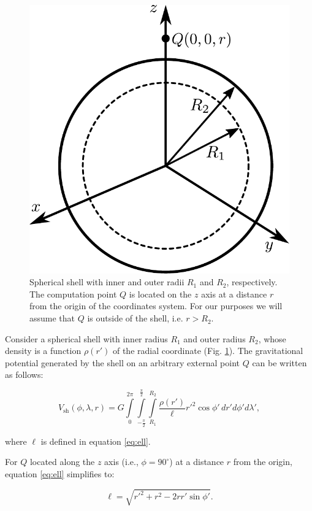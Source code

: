 \documentclass[extra]{gji}
\begin{document}
\begin{figure}
\centering
\includegraphics[width=0.7\linewidth]{figures/spherical-shell.pdf}
\caption{
    Spherical shell with inner and outer radii $R_1$ and $R_2$, respectively.
    The computation point $Q$ is located on the $z$ axis at a distance $r$ from
    the origin of the coordinates system.
    For our purposes we will assume that $Q$ is outside of the shell,
    i.e. $r > R_2$.
}
\label{fig:spherical-shell}
\end{figure}

Consider a spherical shell with inner radius $R_1$ and outer radius $R_2$,
whose density is a function $\rho(r')$ of the radial coordinate
(Fig. \ref{fig:spherical-shell}).
The gravitational potential generated by the shell on an arbitrary external
point $Q$ can be written as follows:

\begin{equation}
    V_\text{sh}(\phi, \lambda, r) = G
    \int\limits_0^{2\pi}
    \int\limits_{-\frac{\pi}{2}}^\frac{\pi}{2}
    \int\limits_{R_1}^{R_2}
    \frac{\rho(r')}{\ell} {r'}^2 \cos\phi' \,
    dr' d\phi' d\lambda',
\end{equation}

\noindent where $\ell$ is defined in equation \ref{eq:ell}.

For $Q$ located along the $z$ axis (i.e., $\phi=90^\circ$) at a distance $r$ from the
origin, equation \ref{eq:ell} simplifies to:

\begin{equation}
    \ell = \sqrt{r'^2 + r^2 - 2 r r' \sin\phi'}.
\end{equation}
\end{document}
